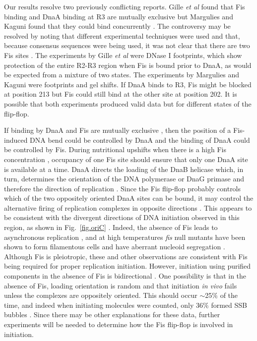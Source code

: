 \documentclass[doublespacing]{narfront}
\newcommand{\fig}[1]{Fig.~\ref{#1}} %
\begin{document}
Our results resolve two previously conflicting reports.
Gille \emph{et al} found that Fis binding and DnaA binding
at R3 are mutually exclusive
\cite{Gille1991}
but Margulies and Kaguni
found that they could bind concurrently
\cite{Margulies.Kaguni1998}.
The controversy may be resolved by noting that different
experimental techniques were used and that,
because consensus sequences were being used,
it was not clear that there are two Fis sites \cite{Schneider.Zen2002}.
The experiments by Gille \emph{et al}
were DNase I footprints, which show protection of the entire
R2-R3 region when Fis is bound prior to DnaA,
as would be expected from a mixture of two states.
The experiments by Margulies and Kaguni
were footprints and gel shifts.
If DnaA binds to R3, Fis might be blocked at position
213 but Fis could still bind at the other site at position 202.
It is possible that
both experiments produced
valid data but for different states
of the
flip-flop.

If binding by DnaA and Fis are mutually exclusive \cite{Gille1991},
then the position of
a Fis-induced DNA bend could be controlled by DnaA
and the binding of DnaA could be controlled by Fis.
During nutritional upshifts when there is a high Fis
concentration \cite{Ball1992},
occupancy of one Fis site should ensure
that
only one DnaA site is available at a time.
DnaA directs the loading of the
DnaB helicase
which, in turn, determines the orientation of the DNA polymerase
or DnaG primase
\cite{Hiasa.Marians1999}
and therefore the direction of replication
\cite{Baker.Kornberg1987,Marszalek.Kaguni1994,Sutton.Kaguni1998,Baker.Bell1998,Carr.Kaguni2001}.
Since the Fis flip-flop probably controls which of the two oppositely
oriented DnaA sites can be bound, it may control the
alternative firing of replication complexes in opposite directions
\cite{Meijer.Messer1980}.
This appears to be consistent with the
divergent directions of DNA initiation
observed
in this region, as shown in \fig{fig.oriC}
\cite{Seufert.Messer1987}.
Indeed,
the absence of Fis leads to asynchronous replication \cite{Boye1992},
and
at high temperatures
\emph{fis} null mutants have been shown to form filamentous
cells and have aberrant nucleoid segregation
\cite{Filutowicz1992}.
Although Fis is pleiotropic,
these and other observations
\cite{Hiasa.Marians1994,Wold.Skarstad1996}
are consistent with Fis being required for proper
replication initiation.
However, initiation using purified components in the absence
of Fis is bidirectional
\cite{Baker.Kornberg1987,Fang.O'Donnell1999}.
One possibility is that in the absence of Fis,
loading orientation is random
\cite{Fang.O'Donnell1999}
and that initiation
\emph{in vivo}
fails unless the complexes are oppositely
oriented.
This should occur $\sim$25\% of the time, and indeed
when initiating molecules were counted,
only 36\% formed SSB bubbles
\cite{Baker.Kornberg1987}.
Since there may be other explanations for these data,
further experiments will
be needed to determine
how the Fis flip-flop is involved in initiation.
\end{document}
